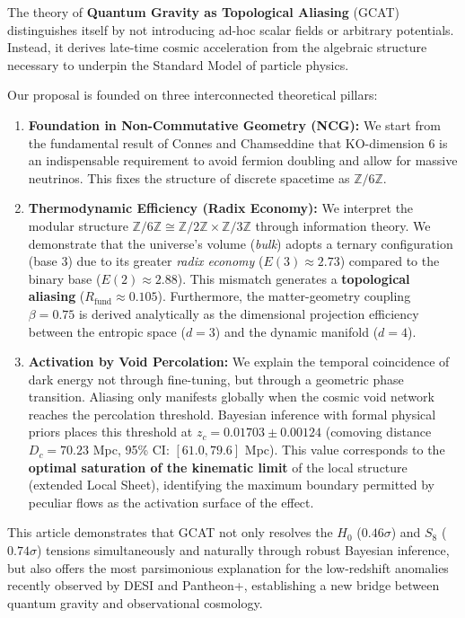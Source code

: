 \documentclass[12pt, a4paper]{article}
\theoremstyle{plain}
\theoremstyle{definition}
\begin{document}
The theory of \textbf{Quantum Gravity as Topological Aliasing} (GCAT) distinguishes itself by not introducing ad-hoc scalar fields or arbitrary potentials. Instead, it derives late-time cosmic acceleration from the algebraic structure necessary to underpin the Standard Model of particle physics.

Our proposal is founded on three interconnected theoretical pillars:

\begin{enumerate}
    \item \textbf{Foundation in Non-Commutative Geometry (NCG):} We start from the fundamental result of Connes and Chamseddine \cite{Connes2008} that KO-dimension 6 is an indispensable requirement to avoid fermion doubling and allow for massive neutrinos. This fixes the structure of discrete spacetime as $\mathbb{Z}/6\mathbb{Z}$.
    
    \item \textbf{Thermodynamic Efficiency (Radix Economy):} We interpret the modular structure $\mathbb{Z}/6\mathbb{Z} \cong \mathbb{Z}/2\mathbb{Z} \times \mathbb{Z}/3\mathbb{Z}$ through information theory. We demonstrate that the universe's volume (\textit{bulk}) adopts a ternary configuration (base 3) due to its greater \textit{radix economy} ($E(3) \approx 2.73$) compared to the binary base ($E(2) \approx 2.88$). This mismatch generates a \textbf{topological aliasing} ($R_{\text{fund}} \approx 0.105$). Furthermore, the matter-geometry coupling $\beta=0.75$ is derived analytically as the dimensional projection efficiency between the entropic space ($d=3$) and the dynamic manifold ($d=4$).
    
    \item \textbf{Activation by Void Percolation:} We explain the temporal coincidence of dark energy not through fine-tuning, but through a geometric phase transition. Aliasing only manifests globally when the cosmic void network reaches the percolation threshold. Bayesian inference with formal physical priors places this threshold at $z_c = 0.01703 \pm 0.00124$ (comoving distance $D_c = 70.23$ Mpc, 95\% CI: $[61.0, 79.6]$ Mpc). This value corresponds to the \textbf{optimal saturation of the kinematic limit} of the local structure (extended Local Sheet), identifying the maximum boundary permitted by peculiar flows as the activation surface of the effect.
\end{enumerate}

This article demonstrates that GCAT not only resolves the $H_0$ ($0.46\sigma$) and $S_8$ ($0.74\sigma$) tensions simultaneously and naturally through robust Bayesian inference, but also offers the most parsimonious explanation for the low-redshift anomalies recently observed by DESI and Pantheon+, establishing a new bridge between quantum gravity and observational cosmology.
\end{document}
